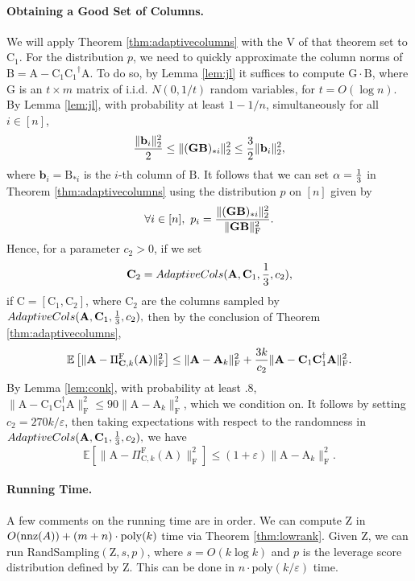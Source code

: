 \documentclass[11pt]{article}
\newcommand{\Expect}[1]{\mbox{}{\mathbb{E}}\left[#1\right]}
\newcommand{\FNormS}[1]{\mbox{}\|#1\|_\mathrm{F}^2}
\newcommand{\pinv}[1]{ {#1}^\dagger}
\newcommand{\mat}[1]{{\ensuremath{\bm{\mathrm{#1}}}}}
\def\b{{\mathbf b}}
\def\matA{\mat{A}}
\def\matB{\mat{B}}
\def\matC{\mat{C}}
\def\matG{\mat{G}}
\def\matV{\mat{V}}
\def\matZ{\mat{Z}}
\def\nnz{{ \rm nnz }}
\def\frac#1#2{{#1\over #2}}
\def\b{{\mathbf b}}
\newcommand{\eps}{\varepsilon}
\newcommand{\poly}{{\mathrm{poly}}}
\begin{document}
\paragraph{Obtaining a Good Set of Columns.}
We will apply 
Theorem \ref{thm:adaptivecolumns} with the $\matV$ 
of that theorem set to $\matC_1$. For the distribution $p$, we need
to quickly approximate the column norms of 
$\matB = \matA-\matC_1 \pinv{\matC_1} \matA$. To do so, 
by Lemma \ref{lem:jl}
it suffices
to compute $\matG \cdot \matB$, where $\matG$ is an $t \times m$
matrix of i.i.d. $N(0,1/t)$ random variables, for $t = O(\log n)$. By
Lemma \ref{lem:jl}, with probability at least $1-1/n$, simultaneously
for all $i \in [n]$, 
$$\frac{\|\b_i\|_2^2}{2} \leq \|(\matG\matB)_{*i}\|_2^2 \leq \frac{3}{2} \|\b_i\|_2^2,$$
where $\b_i = \matB_{*i}$ is the $i$-th column of $\matB$. It follows that we
can set $\alpha = \frac{1}{3}$ in Theorem \ref{thm:adaptivecolumns} using
the distribution $p$ on $[n]$ given by
$$\forall i \in [n], \ p_i = \frac{\|(\matG\matB)_{*i}\|^2_2}{\FNormS{\matG \matB}}.$$
Hence, for a parameter $c_2 > 0$, if we set
$$\matC_2 = AdaptiveCols(\matA, \matC_1, \frac{1}{3}, c_2),$$
if $\matC = [\matC_1, \matC_2]$, where $\matC_2$ are the columns sampled by 
$AdaptiveCols(\matA, \matC_1, \frac{1}{3}, c_2),$
then by the conclusion of Theorem \ref{thm:adaptivecolumns}, 
$$\Expect{ \FNormS{ \matA - \Pi_{\matC,k}^{\mathrm{F}}(\matA) } } \le \FNormS{\matA - \matA_k } 
+ \frac{3k}{c_2} \FNormS{\matA - \matC_1 \matC_1^{\dagger} \matA}.$$
By Lemma \ref{lem:conk}, with probability at least $.8$, 
$\FNormS{\matA - \matC_1 \matC_1^{\dagger} \matA} \leq 90 \FNormS{\matA - \matA_k }$, 
which we condition on. It follows by setting $c_2 = 270k/\eps$, then 
taking expectations with respect to the randomness
in $AdaptiveCols(\matA, \matC_1, \frac{1}{3}, c_2),$ we have
$$\Expect{ \FNormS{ \matA - \Pi_{\matC,k}^{\mathrm{F}}(\matA) } } \le (1+\eps) \FNormS{\matA - \matA_k }.$$

\paragraph{Running Time.}
A few comments on the running time are in order. We can compute $\matZ$ in
$O(\nnz(A)) + (m+n) \cdot \poly(k)$ time via Theorem \ref{thm:lowrank}. Given $\matZ$, we
can run {\textsc RandSampling}$(\matZ, s, p)$, where $s = O(k \log k)$ and $p$ is the leverage
score distribution defined by $\matZ$. This can be done in $n \cdot \poly(k/\eps)$ time. 
\end{document}
